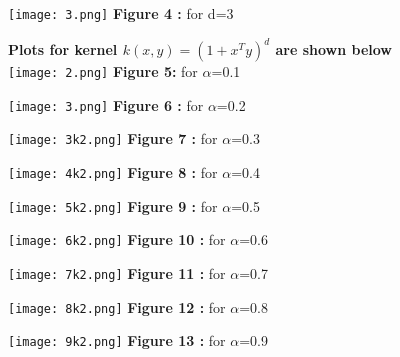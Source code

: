 \documentclass[solution,addpoints,12pt]{exam}
\begin{document}
\begin{questions}
\begin{parts}
\begin{solution}
\hangindent=0.0cm 

\hangindent=5.5cm 
\texttt{[image: 3.png]}
\textbf{Figure 4 :} for d=3 \\

\hangindent=0.0cm 

\textbf{Plots for kernel $k(x,y) = (1+x^Ty)^d$ are shown below}\\ 

\hangindent=5.5cm 
\texttt{[image: 2.png]}
\textbf{Figure 5:} for $\alpha$=0.1\\

\hangindent=0.0cm 

\hangindent=5.5cm 
\texttt{[image: 3.png]}
\textbf{Figure 6 :} for $\alpha$=0.2 \\

\hangindent=0.0cm 

\hangindent=5.5cm 
\texttt{[image: 3k2.png]}
\textbf{Figure 7 :} for $\alpha$=0.3 \\

\hangindent=0.0cm 

\hangindent=5.5cm 
\texttt{[image: 4k2.png]}
\textbf{Figure 8 :} for $\alpha$=0.4 \\

\hangindent=0.0cm 

\hangindent=5.5cm 
\texttt{[image: 5k2.png]}
\textbf{Figure 9 :} for $\alpha$=0.5 \\

\hangindent=0.0cm 
 
\hangindent=5.5cm 
\texttt{[image: 6k2.png]}
\textbf{Figure 10 :} for $\alpha$=0.6 \\

\hangindent=0.0cm 

\hangindent=5.5cm 
\texttt{[image: 7k2.png]}
\textbf{Figure 11 :} for $\alpha$=0.7 \\

\hangindent=0.0cm 

\hangindent=5.5cm 
\texttt{[image: 8k2.png]}
\textbf{Figure 12 :} for $\alpha$=0.8 \\

\hangindent=0.0cm 

\hangindent=5.5cm 
\texttt{[image: 9k2.png]}
\textbf{Figure 13 :} for $\alpha$=0.9 \\


\end{solution}
\end{parts}
\end{questions}
\end{document}
